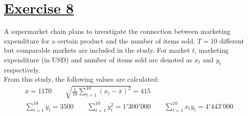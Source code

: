 \documentclass[captions=tableheading, 12pt, headings=small, parskip=half]{scrartcl}
\begin{document}
\section*{\underline{Exercise 8}}

A supermarket chain plans to investigate the connection between marketing expenditure for a certain product and the number of items sold. $T=10$ different but comparable markets are included in the study. For market $t$, marketing expenditure (in USD) and number of items sold are denoted as $x_t$ and $y_t$ respectively.\\
From this study, the following values are calculated:\\
\begin{align*}
&\bar{x}=1170 \qquad \sqrt{\frac{1}{10}\sum_{t = 1}^{10}{(x_t - \bar{x})^2}} = 415\\
&\sum_{t = 1}^{10}{y_t} = 3500 \qquad \sum_{t = 1}^{10}{y_t^2} = 1'300'000 \qquad \sum_{t = 1}^{10}{x_ty_t} = 4'443'000
\end{align*}
\end{document}

